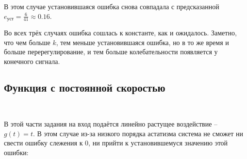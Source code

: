 \documentclass[a4paper]{article}
\begin{document}
В этом случае установившаяся ошибка снова совпадала с предсказанной $e_{\text{уст}} =\frac{6}{41} \approx 0.16$.

Во всех трёх случаях ошибка сошлась к константе, как и ожидалось. Заметно, что чем больше $k$, тем меньше установившаяся ошибка, но в то же время и больше перерегулирование, и тем больше колебательности появляется у конечного сигнала.

\subsection{Функция с постоянной скоростью}\

В этой части задания на вход подаётся линейно растущее воздействие -- $g(t) = t$. В этом случае из-за низкого порядка астатизма система не сможет ни свести ошибку слежения к 0, ни прийти к установившемуся значению этой ошибки: 
\end{document}
